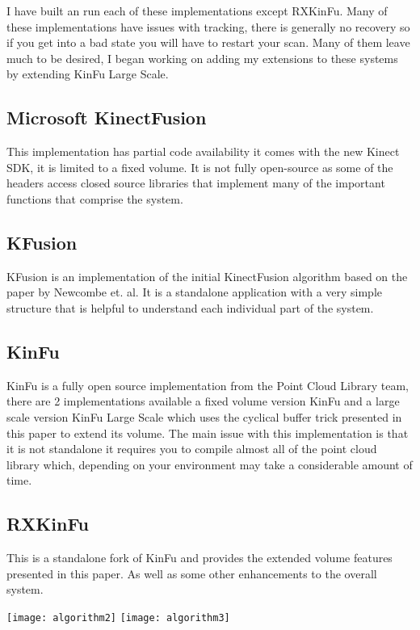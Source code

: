 \documentclass[10pt, twocolumn]{article}
\begin{document}
I have built an run each of these implementations except RXKinFu.  Many of these implementations have issues with tracking, there is generally no recovery so if you get into a bad state you will have to restart your scan. Many of them leave much to be desired, I began working on adding my extensions to these systems by extending KinFu Large Scale.

\subsection{Microsoft KinectFusion}
This implementation has partial code availability it comes with the new Kinect SDK, it is limited to a fixed volume. It is not fully open-source as some of the headers access closed source libraries that implement many of the important functions that comprise the system. 

\subsection{KFusion}
KFusion is an implementation of the initial KinectFusion algorithm based on the paper by Newcombe et. al. It is a standalone application with a very simple structure that is helpful to understand each individual part of the system.

\subsection{KinFu}
KinFu is a fully open source implementation from the Point Cloud Library team, there are 2 implementations available a fixed volume version KinFu and a large scale version KinFu Large Scale which uses the cyclical buffer trick presented in this paper to extend its volume. The main issue with this implementation is that it is not standalone it requires you to compile almost all of the point cloud library which, depending on your environment may take a considerable amount of time.

\subsection{RXKinFu}
This is a standalone fork of KinFu and provides the extended volume features presented in this paper. As well as some other enhancements to the overall system.








\texttt{[image: algorithm2]}
\texttt{[image: algorithm3]}
\end{document}
